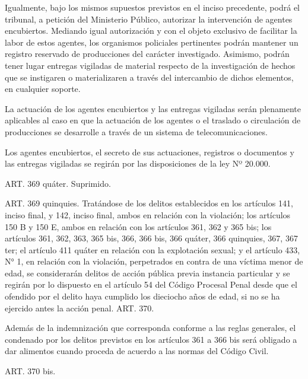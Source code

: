     Igualmente, bajo los mismos supuestos previstos en el inciso precedente, podrá el tribunal, a petición del Ministerio Público, autorizar la intervención de agentes encubiertos. Mediando igual autorización y con el objeto exclusivo de facilitar la labor de estos agentes, los organismos policiales pertinentes podrán mantener un registro reservado de producciones del carácter investigado. Asimismo, podrán tener lugar entregas vigiladas de material respecto de la investigación de hechos que se instigaren o materializaren a través del intercambio de dichos elementos, en cualquier soporte.

    La actuación de los agentes encubiertos y las entregas vigiladas serán plenamente aplicables al caso en que la actuación de los agentes o el traslado o circulación de producciones se desarrolle a través de un sistema de telecomunicaciones.

    Los agentes encubiertos, el secreto de sus actuaciones, registros o documentos y las entregas vigiladas se regirán por las disposiciones de la ley Nº 20.000.


    ART. 369 quáter. Suprimido.


    ART. 369 quinquies.
    Tratándose de los delitos establecidos en los artículos 141, inciso final, y 142, inciso final, ambos en relación con la violación; los artículos 150 B y 150 E, ambos en relación con los artículos 361, 362 y 365 bis; los artículos 361, 362, 363, 365 bis, 366, 366 bis, 366 quáter, 366 quinquies, 367, 367 ter; el artículo 411 quáter en relación con la explotación sexual; y el artículo 433, N° 1, en relación con la violación, perpetrados en contra de una víctima menor de edad, se considerarán delitos de acción pública previa instancia particular y se regirán por lo dispuesto en el artículo 54 del Código Procesal Penal desde que el ofendido por el delito haya cumplido los dieciocho años de edad, si no se ha ejercido antes la acción penal.
    ART. 370.

    Además de la indemnización que corresponda conforme a las reglas generales, el condenado por los delitos previstos en los artículos 361 a 366 bis será obligado a dar alimentos cuando proceda de acuerdo a las normas del Código Civil.

    ART. 370 bis.

